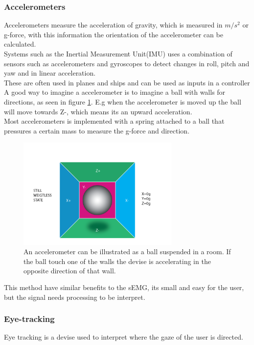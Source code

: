 \subsubsection{Accelerometers}
Accelerometers measure the acceleration of gravity, which is measured in $m/s^2$ or g-force, with this information the orientation of the accelerometer can be calculated.\\
Systems such as the Inertial Measurement Unit(IMU) uses a combination of sensors such as accelerometers and gyroscopes to detect changes in roll, pitch and yaw and in linear acceleration\cite{IMUWorki40:online}.\\ These are often used in planes and ships and can be used as inputs in a controller\\ 
A good way to imagine a accelerometer is to imagine a ball with walls for directions, as seen in figure \ref{fig:spring}. E.g when the accelerometer is moved up the ball will move towards Z-, which means its an upward acceleration.\\
Most accelerometers is implemented with a spring attached to a ball that pressures a certain mass to measure the g-force and direction. 
\begin{figure}[H]
 \centering
\includegraphics[width=8cm]{Figures/Technical_figures/spring.png}
 \caption{An accelerometer can be illustrated as a ball suspended in a room. If the ball touch one of the walls the devise is accelerating in the opposite direction of that wall. \cite{Gyroskop}}
 \label{fig:spring} 
\end{figure}

This method have similar benefits to the sEMG, its small and easy for the user, but the signal needs processing to be interpret.
\\ 
\subsubsection*{Eye-tracking}
Eye tracking is a devise used to interpret where the gaze of the user is directed. 

